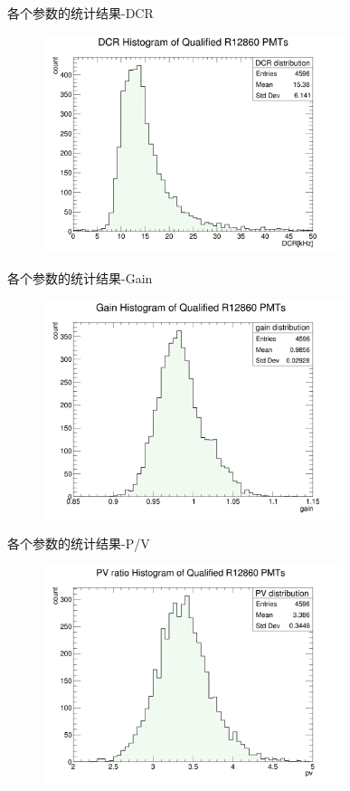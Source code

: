 \documentclass[11pt,compress,xcolor=x11names,UTF8]{beamer}
\begin{document}
\begin{frame}{各个参数的统计结果-DCR}
\begin{figure}
\centering
\includegraphics[width=0.78\textwidth]{figures/dcr.png}
\end{figure}
\end{frame}
\begin{frame}{各个参数的统计结果-Gain}
\begin{figure}
\centering
\includegraphics[width=0.78\textwidth]{figures/gain.png}
\end{figure}
\end{frame}
\begin{frame}{各个参数的统计结果-P/V}
\begin{figure}
\centering
\includegraphics[width=0.78\textwidth]{figures/pv.png}
\end{figure}
\end{frame}
\end{document}
